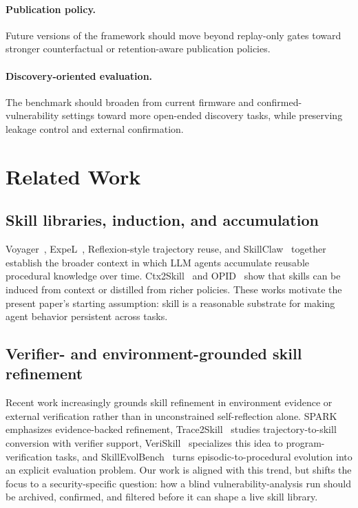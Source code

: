 \documentclass[11pt]{article}
\begin{document}
\paragraph{Publication policy.}
Future versions of the framework should move beyond replay-only gates toward stronger
counterfactual or retention-aware publication policies.

\paragraph{Discovery-oriented evaluation.}
The benchmark should broaden from current firmware and confirmed-vulnerability settings
toward more open-ended discovery tasks, while preserving leakage control and external
confirmation.

\section{Related Work}
\label{sec:related}

\subsection{Skill libraries, induction, and accumulation}

Voyager~\cite{voyager}, ExpeL~\cite{expel}, Reflexion-style trajectory reuse, and
SkillClaw~\cite{skillclaw} together establish the broader context in which LLM agents
accumulate reusable procedural knowledge over time.  Ctx2Skill~\cite{ctx2skill} and
OPID~\cite{opid} show that skills can be induced from context or distilled from richer
policies.  These works motivate the present paper's starting assumption: skill is a
reasonable substrate for making agent behavior persistent across tasks.

\subsection{Verifier- and environment-grounded skill refinement}

Recent work increasingly grounds skill refinement in environment evidence or external
verification rather than in unconstrained self-reflection alone.  SPARK~\cite{spark}
emphasizes evidence-backed refinement, Trace2Skill~\cite{trace2skill} studies
trajectory-to-skill conversion with verifier support, VeriSkill~\cite{veriskill}
specializes this idea to program-verification tasks, and SkillEvolBench~\cite{skillevolbench}
turns episodic-to-procedural evolution into an explicit evaluation problem.  Our work is
aligned with this trend, but shifts the focus to a security-specific question: how a
blind vulnerability-analysis run should be archived, confirmed, and filtered before it
can shape a live skill library.
\end{document}

